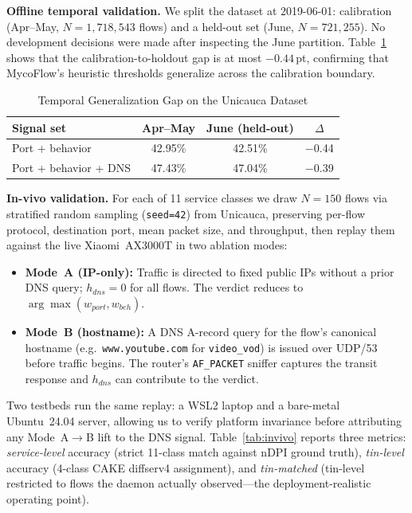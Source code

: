 \documentclass[conference]{IEEEtran}
\begin{document}
\textbf{Offline temporal validation.}
We split the dataset at 2019-06-01: calibration (Apr--May,
$N=1{,}718{,}543$ flows) and a held-out set (June, $N=721{,}255$).
No development decisions were made after inspecting the June partition.
Table~\ref{tab:temporal} shows that the calibration-to-holdout gap is
at most $-0.44$\,pt, confirming that MycoFlow's heuristic thresholds
generalize across the calibration boundary.

\begin{table}[t]
\caption{Temporal Generalization Gap on the Unicauca Dataset}
\label{tab:temporal}
\centering
\small
\begin{tabular}{l|cc|c}
\toprule
\textbf{Signal set} & \textbf{Apr--May} & \textbf{June (held-out)} & $\Delta$ \\
\midrule
Port + behavior       & 42.95\% & 42.51\% & $-$0.44 \\
Port + behavior + DNS & 47.43\% & 47.04\% & $-$0.39 \\
\bottomrule
\end{tabular}
\end{table}

\textbf{In-vivo validation.}
For each of 11 service classes we draw $N=150$ flows via stratified
random sampling (\texttt{seed=42}) from Unicauca, preserving per-flow
protocol, destination port, mean packet size, and throughput, then
replay them against the live Xiaomi~AX3000T in two ablation modes:
\begin{itemize}
\item \textbf{Mode~A (IP-only):} Traffic is directed to fixed public IPs
  without a prior DNS query; $h_{dns}=0$ for all flows.
  The verdict reduces to $\arg\max(w_{port}, w_{beh})$.
\item \textbf{Mode~B (hostname):} A DNS A-record query for the flow's
  canonical hostname (e.g.\ \texttt{www.youtube.com} for
  \texttt{video\_vod}) is issued over UDP/53 before traffic begins.
  The router's \texttt{AF\_PACKET} sniffer captures the transit response
  and $h_{dns}$ can contribute to the verdict.
\end{itemize}

Two testbeds run the same replay: a WSL2 laptop and a bare-metal
Ubuntu~24.04 server, allowing us to verify platform invariance before
attributing any Mode~A$\to$B lift to the DNS signal.
Table~\ref{tab:invivo} reports three metrics:
\emph{service-level} accuracy (strict 11-class match against nDPI ground
truth), \emph{tin-level} accuracy (4-class CAKE diffserv4 assignment),
and \emph{tin-matched} (tin-level restricted to flows the daemon actually
observed---the deployment-realistic operating point).
\end{document}
